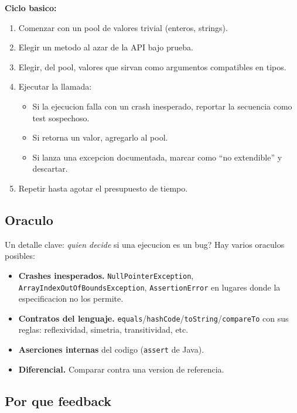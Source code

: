 \documentclass[12pt,a4paper]{article}
\begin{document}
\textbf{Ciclo basico:}

\begin{enumerate}
  \item Comenzar con un pool de valores trivial (enteros, strings).
  \item Elegir un metodo al azar de la API bajo prueba.
  \item Elegir, del pool, valores que sirvan como argumentos compatibles en tipos.
  \item Ejecutar la llamada:
  \begin{itemize}
    \item Si la ejecucion falla con un crash inesperado, reportar la secuencia como test
    sospechoso.
    \item Si retorna un valor, agregarlo al pool.
    \item Si lanza una excepcion documentada, marcar como ``no extendible'' y descartar.
  \end{itemize}
  \item Repetir hasta agotar el presupuesto de tiempo.
\end{enumerate}

\subsection{Oraculo}

Un detalle clave: \emph{quien decide} si una ejecucion es un bug? Hay varios oraculos posibles:

\begin{itemize}
  \item \textbf{Crashes inesperados.} \texttt{NullPointerException},
  \texttt{ArrayIndexOutOfBoundsException}, \texttt{AssertionError} en lugares donde la
  especificacion no los permite.
  \item \textbf{Contratos del lenguaje.}
  \texttt{equals}/\texttt{hashCode}/\texttt{toString}/\texttt{compareTo} con sus reglas:
  reflexividad, simetria, transitividad, etc.
  \item \textbf{Aserciones internas} del codigo (\texttt{assert} de Java).
  \item \textbf{Diferencial.} Comparar contra una version de referencia.
\end{itemize}

\subsection{Por que feedback}
\end{document}
